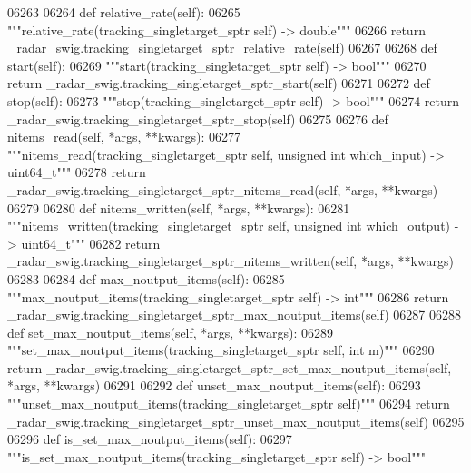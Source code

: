 \begin{DoxyCode}
{{{{{{{{{{{{{{{{{{{{{06263 
06264     \textcolor{keyword}{def }relative_rate(self):
06265         \textcolor{stringliteral}{"""relative\_rate(tracking\_singletarget\_sptr self) -> double"""}
06266         \textcolor{keywordflow}{return} \_radar\_swig.tracking\_singletarget\_sptr\_relative\_rate(self)
06267 
06268     \textcolor{keyword}{def }start(self):
06269         \textcolor{stringliteral}{"""start(tracking\_singletarget\_sptr self) -> bool"""}
06270         \textcolor{keywordflow}{return} \_radar\_swig.tracking\_singletarget\_sptr\_start(self)
06271 
06272     \textcolor{keyword}{def }stop(self):
06273         \textcolor{stringliteral}{"""stop(tracking\_singletarget\_sptr self) -> bool"""}
06274         \textcolor{keywordflow}{return} \_radar\_swig.tracking\_singletarget\_sptr\_stop(self)
06275 
06276     \textcolor{keyword}{def }nitems_read(self, *args, **kwargs):
06277         \textcolor{stringliteral}{"""nitems\_read(tracking\_singletarget\_sptr self, unsigned int which\_input) -> uint64\_t"""}
06278         \textcolor{keywordflow}{return} \_radar\_swig.tracking\_singletarget\_sptr\_nitems\_read(self, *args, **kwargs)
06279 
06280     \textcolor{keyword}{def }nitems_written(self, *args, **kwargs):
06281         \textcolor{stringliteral}{"""nitems\_written(tracking\_singletarget\_sptr self, unsigned int which\_output) -> uint64\_t"""}
06282         \textcolor{keywordflow}{return} \_radar\_swig.tracking\_singletarget\_sptr\_nitems\_written(self, *args, **kwargs)
06283 
06284     \textcolor{keyword}{def }max_noutput_items(self):
06285         \textcolor{stringliteral}{"""max\_noutput\_items(tracking\_singletarget\_sptr self) -> int"""}
06286         \textcolor{keywordflow}{return} \_radar\_swig.tracking\_singletarget\_sptr\_max\_noutput\_items(self)
06287 
06288     \textcolor{keyword}{def }set_max_noutput_items(self, *args, **kwargs):
06289         \textcolor{stringliteral}{"""set\_max\_noutput\_items(tracking\_singletarget\_sptr self, int m)"""}
06290         \textcolor{keywordflow}{return} \_radar\_swig.tracking\_singletarget\_sptr\_set\_max\_noutput\_items(self, *args, **kwargs)
06291 
06292     \textcolor{keyword}{def }unset_max_noutput_items(self):
06293         \textcolor{stringliteral}{"""unset\_max\_noutput\_items(tracking\_singletarget\_sptr self)"""}
06294         \textcolor{keywordflow}{return} \_radar\_swig.tracking\_singletarget\_sptr\_unset\_max\_noutput\_items(self)
06295 
06296     \textcolor{keyword}{def }is_set_max_noutput_items(self):
06297         \textcolor{stringliteral}{"""is\_set\_max\_noutput\_items(tracking\_singletarget\_sptr self) -> bool"""}
}}}}}}}}}}}}}}}}}}}}}
\end{DoxyCode}
